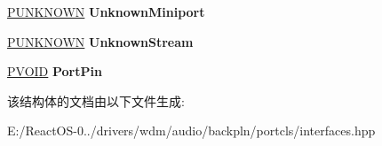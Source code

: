 \begin{DoxyCompactItemize}
\item 
\mbox{\label{struct_s_u_b_d_e_v_i_c_e___d_e_s_c_r_i_p_t_o_r_aed44f840c218c8048f9b01e29d69f9ca}} 
\hyperlink{interface_i_unknown}{P\+U\+N\+K\+N\+O\+WN} {\bfseries Unknown\+Miniport}
\item 
\mbox{\label{struct_s_u_b_d_e_v_i_c_e___d_e_s_c_r_i_p_t_o_r_a8c89cbf9e37eb7b2cf605cf6c2c01946}} 
\hyperlink{interface_i_unknown}{P\+U\+N\+K\+N\+O\+WN} {\bfseries Unknown\+Stream}
\item 
\mbox{\label{struct_s_u_b_d_e_v_i_c_e___d_e_s_c_r_i_p_t_o_r_aab56e3aac81ed10cc80ca449ba50f4dc}} 
\hyperlink{interfacevoid}{P\+V\+O\+ID} {\bfseries Port\+Pin}
\end{DoxyCompactItemize}


该结构体的文档由以下文件生成\+:\begin{DoxyCompactItemize}
\item 
E\+:/\+React\+O\+S-\/0../drivers/wdm/audio/backpln/portcls/interfaces.\+hpp\end{DoxyCompactItemize}
